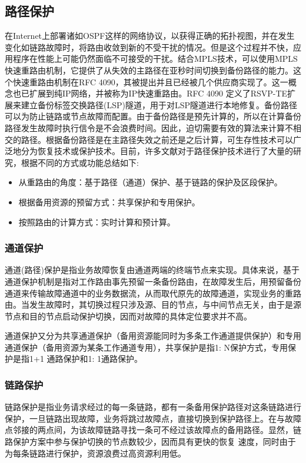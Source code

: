 \subsection{路径保护}
在Internet上部署诸如OSPF这样的网络协议，以获得正确的拓扑视图，并在发生变化如链路故障时，将路由收敛到新的不受干扰的情况。但是这个过程并不快，应用程序在性能上可能仍然面临不可接受的干扰。结合MPLS技术，可以使用MPLS快速重路由机制，它提供了从失效的主路径在亚秒时间切换到备份路径的能力。这个快速重路由机制在RFC 4090\cite{pan2005fast}，其被提出并且已经被几个供应商实现了。这一概念也已扩展到纯IP网络，并被称为IP快速重路由\cite{shand2010ip}。RFC 4090 定义了RSVP-TE扩展来建立备份标签交换路径(LSP)隧道，用于对LSP隧道进行本地修复。备份路径可以为防止链路或节点故障而配置。由于备份路径是预先计算的，所以在计算备份路径发生故障时执行信令是不会浪费时间。因此，迫切需要有效的算法来计算不相交的路径。根据备份路径是在主路径失效之前还是之后计算，可生存性技术可以广泛地分为恢复技术或保护技术。目前，许多文献对于路径保护技术进行了大量的研究，根据不同的方式或功能总结如下:
\begin{itemize}
\item 从重路由的角度：基于路径（通道）保护、基于链路的保护及区段保护。
\item 根据备用资源的预留方式：共享保护和专用保护。
\item 按照路由的计算方式：实时计算和预计算。
\end{itemize}
\subsubsection{通道保护}
通道(路径)保护是指业务故障恢复由通道两端的终端节点来实现。具体来说，基于通道保护机制是指对工作路由事先预留一条备份路由，在故障发生后，用预留备份通道来传输故障通道中的业务数据流，从而取代原先的故障通道，实现业务的重路由。当发生故障时，其切换过程只涉及源、目的节点，与中间节点无关，由于是源节点和目的节点启动保护切换，因而对故障的具体定位要求并不高。

通道保护又分为共享通道保护（备用资源能同时为多条工作通道提供保护）和专用通道保护（备用资源为某条工作通道专用），共享保护是指1: N保护方式，专用保护是指1+1 通路保护和1: 1通路保护。
\subsubsection{链路保护}
链路保护是指业务请求经过的每一条链路，都有一条备用保护路径对这条链路进行保护，一旦链路出现故障，业务将跳过故障点，直接切换到保护路径上。在与故障点邻接的两点间，为该故障链路寻找一条可不经过该故障点的备用路径。显然，链路保护方案中参与保护切换的节点数较少，因而具有更快的恢复 速度，同时由于为每条链路进行保护，资源浪费过高资源利用低。

